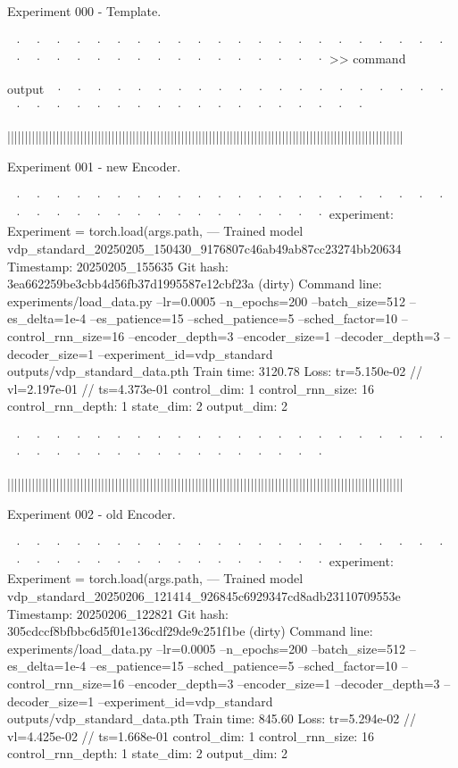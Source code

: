 
Experiment 000 - Template. 


~· ~· ~· ~· ~· ~· ~· ~· ~· ~· ~· ~· ~· ~· ~· ~· ~· ~· ~· ~· ~· ~· ~· ~· ~· ~· ~· ~· ~· ~· ~· ~· ~· ~· ~· ~· ~· ~· 
>> command

output
~· ~· ~· ~· ~· ~· ~· ~· ~· ~· ~· ~· ~· ~· ~· ~· ~· ~· ~· ~· ~· ~· ~· ~· ~· ~· ~· ~· ~· ~· ~· ~· ~· ~· ~· ~· ~· ~· 



||||||||||||||||||||||||||||||||||||||||||||||||||||||||||||||||||||||||||||||||||||||||||||||||||||||||||||||||||


Experiment 001 - new Encoder. 	


~· ~· ~· ~· ~· ~· ~· ~· ~· ~· ~· ~· ~· ~· ~· ~· ~· ~· ~· ~· ~· ~· ~· ~· ~· ~· ~· ~· ~· ~· ~· ~· ~· ~· ~· ~· ~· ~· 
  experiment: Experiment = torch.load(args.path,
--- Trained model   vdp_standard_20250205_150430_9176807c46ab49ab87cc23274bb20634
Timestamp:      20250205_155635
Git hash:       3ea662259be3cbb4d56fb37d1995587e12cbf23a (dirty)
Command line:   experiments/load_data.py --lr=0.0005 --n_epochs=200 --batch_size=512 --es_delta=1e-4 --es_patience=15 --sched_patience=5 --sched_factor=10 --control_rnn_size=16 --encoder_depth=3 --encoder_size=1 --decoder_depth=3 --decoder_size=1 --experiment_id=vdp_standard outputs/vdp_standard_data.pth
Train time:     3120.78
Loss:           tr=5.150e-02 // vl=2.197e-01 // ts=4.373e-01
control_dim: 1
control_rnn_size: 16
control_rnn_depth: 1
state_dim: 2
output_dim: 2

~· ~· ~· ~· ~· ~· ~· ~· ~· ~· ~· ~· ~· ~· ~· ~· ~· ~· ~· ~· ~· ~· ~· ~· ~· ~· ~· ~· ~· ~· ~· ~· ~· ~· ~· ~· ~· ~· 



||||||||||||||||||||||||||||||||||||||||||||||||||||||||||||||||||||||||||||||||||||||||||||||||||||||||||||||||||


Experiment 002 - old Encoder. 	


~· ~· ~· ~· ~· ~· ~· ~· ~· ~· ~· ~· ~· ~· ~· ~· ~· ~· ~· ~· ~· ~· ~· ~· ~· ~· ~· ~· ~· ~· ~· ~· ~· ~· ~· ~· ~· ~· 
  experiment: Experiment = torch.load(args.path,
--- Trained model   vdp_standard_20250206_121414_926845c6929347cd8adb23110709553e
Timestamp:      20250206_122821
Git hash:       305cdccf8bfbbc6d5f01e136cdf29de9c251f1be (dirty)
Command line:   experiments/load_data.py --lr=0.0005 --n_epochs=200 --batch_size=512 --es_delta=1e-4 --es_patience=15 --sched_patience=5 --sched_factor=10 --control_rnn_size=16 --encoder_depth=3 --encoder_size=1 --decoder_depth=3 --decoder_size=1 --experiment_id=vdp_standard outputs/vdp_standard_data.pth
Train time:     845.60
Loss:           tr=5.294e-02 // vl=4.425e-02 // ts=1.668e-01
control_dim: 1
control_rnn_size: 16
control_rnn_depth: 1
state_dim: 2
output_dim: 2

